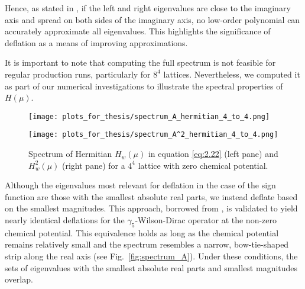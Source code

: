 Hence, as stated in \cite{11}, if the left and right eigenvalues are close to the imaginary axis and spread on both sides of the imaginary axis, no low-order polynomial can accurately approximate all eigenvalues. This highlights the significance of deflation as a means of improving approximations.

It is important to note that computing the full spectrum is not feasible for regular production runs, particularly for $8^4$ lattices. Nevertheless, we computed it as part of our numerical investigations to illustrate the spectral properties of $H(\mu)$.

\begin{figure}[H]
    \centering
    \begin{minipage}{0.45\textwidth}
        \centering
        \texttt{[image: plots\_for\_thesis/spectrum\_A\_hermitian\_4\_to\_4.png]} %
    \end{minipage}%
    \hspace{0.02\textwidth} %
    \begin{minipage}{0.45\textwidth}
        \centering
        \texttt{[image: plots\_for\_thesis/spectrum\_A^2\_hermitian\_4\_to\_4.png]} %
    \end{minipage}
    \caption{\small Spectrum of Hermitian $ H_w(\mu)$ in equation \ref{eq:2.22} (left pane) and $H_w^2(\mu)$ (right pane) for a $4^4$ lattice with zero chemical potential.}
    \label{fig:spectrum_A_herm}
\end{figure}

Although the eigenvalues most relevant for deflation in the case of the sign function are those with the smallest absolute real parts, we instead deflate based on the smallest magnitudes. This approach, borrowed from \cite{11}, is validated to yield nearly identical deflations for the $\gamma_5$-Wilson-Dirac operator at the non-zero chemical potential. This equivalence holds as long as the chemical potential remains relatively small and the spectrum resembles a narrow, bow-tie-shaped strip along the real axis (see Fig.~\ref{fig:spectrum_A}). Under these conditions, the sets of eigenvalues with the smallest absolute real parts and smallest magnitudes overlap.

